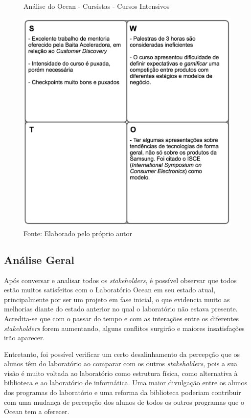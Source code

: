 \begin{figure}[H]
\caption{Análise do Ocean - Cursistas - Cursos Intensivos}
\centerline{\includegraphics[scale=0.75]{img/cursosintensivosswot}}
\label{fig:swotcursistasintensivos}
\caption* {Fonte: Elaborado pelo próprio autor}
\end{figure}

\subsection{Análise Geral}

Após conversar e analisar todos os \textit{stakeholders}, é possível observar que todos estão muitos satisfeitos com o Laboratório Ocean em seu estado atual, principalmente por ser um projeto em fase inicial, o que evidencia muito as melhorias diante do estado anterior no qual o laboratório não estava presente. Acredita-se que com o passar do tempo e com as interações entre os diferentes \textit{stakeholders} forem aumentando, alguns conflitos surgirão e maiores insatisfações irão aparecer.

Entretanto, foi possível verificar um certo desalinhamento da percepção que os alunos têm do laboratório ao comparar com os outros \textit{stakeholders}, pois a sua visão é muito voltada ao laboratório como estrutura física, como alternativa à biblioteca e ao laboratório de informática. Uma maior divulgação entre os alunos dos programas do laboratório e uma reforma da biblioteca poderiam contribuir com uma mudança de percepção dos alunos de todos os outros programas que o Ocean tem a oferecer.

